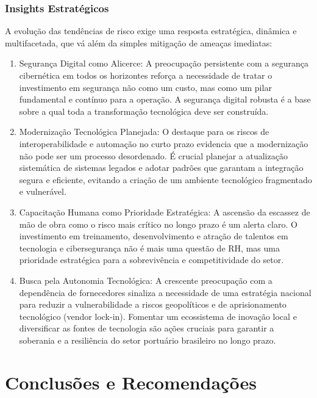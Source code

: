 \documentclass[
  portuguese,
  letterpaper,
  DIV=11,
  numbers=noendperiod]{scrreprt}
\providecommand{\tightlist}{%
  \setlength{\itemsep}{0pt}\setlength{\parskip}{0pt}}
\begin{document}
\subsection{Insights Estratégicos}\label{insights-estratuxe9gicos-4}

A evolução das tendências de risco exige uma resposta estratégica,
dinâmica e multifacetada, que vá além da simples mitigação de ameaças
imediatas:

\begin{enumerate}
\def\labelenumi{\arabic{enumi}.}
\tightlist
\item
  Segurança Digital como Alicerce: A preocupação persistente com a
  segurança cibernética em todos os horizontes reforça a necessidade de
  tratar o investimento em segurança não como um custo, mas como um
  pilar fundamental e contínuo para a operação. A segurança digital
  robusta é a base sobre a qual toda a transformação tecnológica deve
  ser construída.
\item
  Modernização Tecnológica Planejada: O destaque para os riscos de
  interoperabilidade e automação no curto prazo evidencia que a
  modernização não pode ser um processo desordenado. É crucial planejar
  a atualização sistemática de sistemas legados e adotar padrões que
  garantam a integração segura e eficiente, evitando a criação de um
  ambiente tecnológico fragmentado e vulnerável.
\item
  Capacitação Humana como Prioridade Estratégica: A ascensão da escassez
  de mão de obra como o risco mais crítico no longo prazo é um alerta
  claro. O investimento em treinamento, desenvolvimento e atração de
  talentos em tecnologia e cibersegurança não é mais uma questão de RH,
  mas uma prioridade estratégica para a sobrevivência e competitividade
  do setor.
\item
  Busca pela Autonomia Tecnológica: A crescente preocupação com a
  dependência de fornecedores sinaliza a necessidade de uma estratégia
  nacional para reduzir a vulnerabilidade a riscos geopolíticos e de
  aprisionamento tecnológico (vendor lock-in). Fomentar um ecossistema
  de inovação local e diversificar as fontes de tecnologia são ações
  cruciais para garantir a soberania e a resiliência do setor portuário
  brasileiro no longo prazo.
\end{enumerate}


\chapter{Conclusões e
Recomendações}\label{conclusuxf5es-e-recomendauxe7uxf5es}
\end{document}
